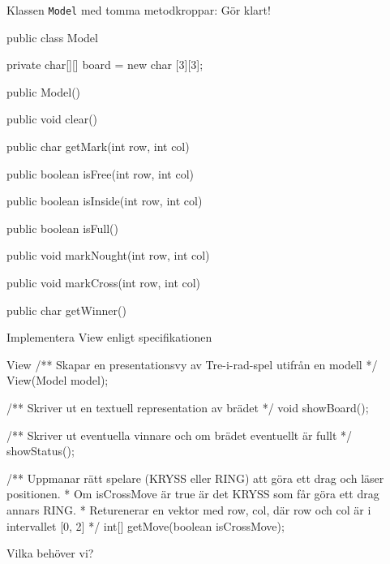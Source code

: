 \documentclass{lecturenotes}
\begin{document}
\begin{Slide}{Klassen \texttt{Model} med tomma metodkroppar: Gör klart!}

\begin{Code}
public class Model {
    private char[][] board = new char [3][3];
    
    public Model(){    }
    
    public void clear(){    }
    
    public char getMark(int row, int col){    }
    
    public boolean isFree(int row, int col){    }

    public boolean isInside(int row, int col){    }
    
    public boolean isFull(){    }

    public void markNought(int row, int col){    }

    public void markCross(int row, int col){    }
    
    public char getWinner(){    }
}
\end{Code}
\end{Slide}

\begin{Slide}{Implementera View enligt specifikationen}
\begin{ClassSpec}{View}
/** Skapar en presentationsvy av Tre-i-rad-spel utifrån en modell */
View(Model model);

/** Skriver ut en textuell representation av brädet */
void showBoard();

/** Skriver ut eventuella vinnare och om brädet eventuellt är fullt */
showStatus();

/** Uppmanar rätt spelare (KRYSS eller RING) att göra ett drag och läser positionen.
*   Om isCrossMove är true är det KRYSS som får göra ett drag annars RING.
*   Returenerar en vektor med {row, col}, där row och col är i intervallet [0, 2]  */
int[] getMove(boolean isCrossMove);
\end{ClassSpec}
\vspace{2em}
\footnotesize Vilka  behöver vi? 
\end{Slide}
\end{document}
